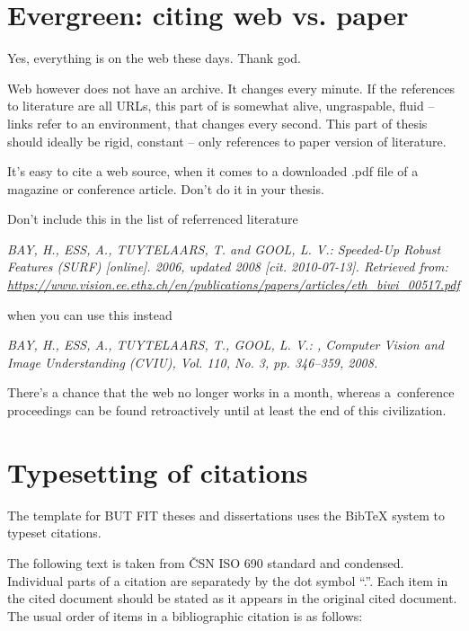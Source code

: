 \section{Evergreen: citing web vs. paper}

Yes, everything is on the web these days. Thank god.

Web however does not have an archive. It changes every minute. If the references to literature are all URLs, this part of is somewhat alive, ungraspable, fluid -- links refer to an environment, that changes every second. This part of thesis should ideally be rigid, constant -- only references to paper version of literature.

It's easy to cite a web source, when it comes to a downloaded .pdf file of a magazine or conference article. Don't do it in your thesis.
\bigskip

\noindent Don't include this in the list of referrenced literature

\noindent \it BAY, H., ESS, A., TUYTELAARS, T. and GOOL, L. V.: Speeded-Up Robust Features (SURF) [online]. 2006, updated 2008 [cit. 2010-07-13]. Retrieved from: \url{https://www.vision.ee.ethz.ch/en/publications/papers/articles/eth_biwi_00517.pdf}
\bigskip
\rm

\noindent when you can use this instead

\noindent \it BAY, H., ESS, A., TUYTELAARS, T., GOOL, L. V.: , Computer Vision and Image Understanding (CVIU), Vol. 110, No. 3, pp. 346–359, 2008.
\bigskip
\rm

There's a chance that the web no longer works in a month, whereas a~conference proceedings can be found retroactively until at least the end of this civilization.


\section{Typesetting of citations}

The template for BUT FIT theses and dissertations uses the BibTeX system to typeset citations.

The following text is taken from ČSN ISO 690 standard and condensed. Individual parts of a citation are separatedy by the dot symbol ``.''.
Each item in the cited document should be stated as it appears in the original cited document. The usual order of items in a bibliographic citation is as follows:

